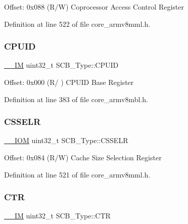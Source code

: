 Offset\+: 0x088 (R/W) Coprocessor Access Control Register 

Definition at line 522 of file core\+\_\+armv8mml.\+h.

\mbox{\label{struct_s_c_b___type_a21e08d546d8b641bee298a459ea73e46}} 
\subsubsection{\texorpdfstring{C\+P\+U\+ID}{CPUID}}
{\footnotesize\ttfamily \hyperlink{core__sc300_8h_a4cc1649793116d7c2d8afce7a4ffce43}{\+\_\+\+\_\+\+IM} uint32\+\_\+t S\+C\+B\+\_\+\+Type\+::\+C\+P\+U\+ID}

Offset\+: 0x000 (R/ ) C\+P\+U\+ID Base Register 

Definition at line 383 of file core\+\_\+armv8mbl.\+h.

\mbox{\label{struct_s_c_b___type_ad3884e8b6504ec63c1eaa8742e94df3d}} 
\subsubsection{\texorpdfstring{C\+S\+S\+E\+LR}{CSSELR}}
{\footnotesize\ttfamily \hyperlink{core__sc300_8h_ab6caba5853a60a17e8e04499b52bf691}{\+\_\+\+\_\+\+I\+OM} uint32\+\_\+t S\+C\+B\+\_\+\+Type\+::\+C\+S\+S\+E\+LR}

Offset\+: 0x084 (R/W) Cache Size Selection Register 

Definition at line 521 of file core\+\_\+armv8mml.\+h.

\mbox{\label{struct_s_c_b___type_af3fe705fef8762763b6d61dbdf0ccc3d}} 
\subsubsection{\texorpdfstring{C\+TR}{CTR}}
{\footnotesize\ttfamily \hyperlink{core__sc300_8h_a4cc1649793116d7c2d8afce7a4ffce43}{\+\_\+\+\_\+\+IM} uint32\+\_\+t S\+C\+B\+\_\+\+Type\+::\+C\+TR}

